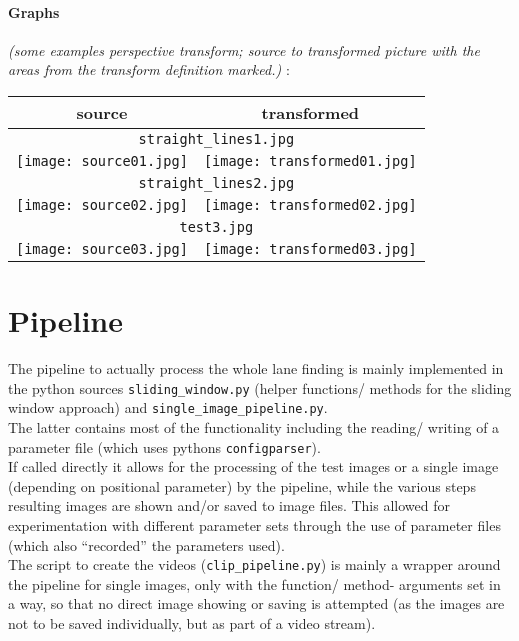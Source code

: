 \documentclass[a4paper]{article}
\begin{document}
\paragraph{Graphs}
\textit{(some examples perspective transform; source to transformed picture
with the areas from the transform definition marked.)}
:\\
\begin{tabular}{ |c|c| }
  \hline
  source & transformed \\
  \hline
  \multicolumn{2}{|c|}{\texttt{straight\_lines1.jpg}} \\
  \texttt{[image: source01.jpg]} & \texttt{[image: transformed01.jpg]} \\
  \hline
  \multicolumn{2}{|c|}{\texttt{straight\_lines2.jpg}} \\
  \texttt{[image: source02.jpg]} & \texttt{[image: transformed02.jpg]} \\
  \hline
  \multicolumn{2}{|c|}{\texttt{test3.jpg}} \\
  \texttt{[image: source03.jpg]} & \texttt{[image: transformed03.jpg]} \\
  \hline
\end{tabular}

\section{Pipeline}
The pipeline to actually process the whole lane finding is mainly implemented
in the python sources \texttt{sliding\_window.py} (helper functions/ methods
for the sliding window approach) and \texttt{single\_image\_pipeline.py}.
\\
The latter contains most of the functionality including the reading/ writing of
a parameter file (which uses pythons \texttt{configparser}).
\\
If called directly it allows for the processing of the test images or a single
image (depending on positional parameter) by the pipeline, while the various
steps resulting images are shown and/or saved to image files.
This allowed for experimentation with different parameter sets through the use
of parameter files (which also \enquote{recorded} the parameters used).
\\
The script to create the videos (\texttt{clip\_pipeline.py}) is mainly a wrapper
around the pipeline for single images, only with the function/ method- arguments
set in a way, so that no direct image showing or saving is attempted (as the
images are not to be saved individually, but as part of a video stream).
\end{document}
